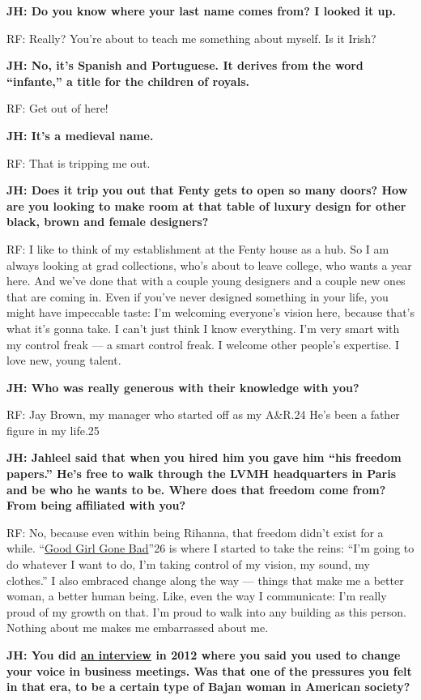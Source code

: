 \textbf{JH: Do you know where your last name comes from? I looked it
up.}

RF: Really? You're about to teach me something about myself. Is it
Irish?

\textbf{JH: No, it's Spanish and Portuguese. It derives from the word
``infante,'' a title for the children of royals.}

RF: Get out of here!

\textbf{JH: It's a medieval name.}

RF: That is tripping me out.

\textbf{JH: Does it trip you out that Fenty gets to open so many doors?
How are you looking to make room at that table of luxury design for
other black, brown and female designers?}

RF: I like to think of my establishment at the Fenty house as a hub. So
I am always looking at grad collections, who's about to leave college,
who wants a year here. And we've done that with a couple young designers
and a couple new ones that are coming in. Even if you've never designed
something in your life, you might have impeccable taste: I'm welcoming
everyone's vision here, because that's what it's gonna take. I can't
just think I know everything. I'm very smart with my control freak --- a
smart control freak. I welcome other people's expertise. I love new,
young talent.

\textbf{JH: Who was really generous with their knowledge with you?}

RF: Jay Brown, my manager who started off as my A\&R.24 He's been a
father figure in my life.25

\textbf{JH: Jahleel said that when you hired him you gave him ``his
freedom papers.'' He's free to walk through the LVMH headquarters in
Paris and be who he wants to be. Where does that freedom come from? From
being affiliated with you?}

RF: No, because even within being Rihanna, that freedom didn't exist for
a while.
``\href{https://open.spotify.com/album/4OXnPSBtZo8PBFiTOfuumP}{Good Girl
Gone Bad}''26 is where I started to take the reins: ``I'm going to do
whatever I want to do, I'm taking control of my vision, my sound, my
clothes.'' I also embraced change along the way --- things that make me
a better woman, a better human being. Like, even the way I communicate:
I'm really proud of my growth on that. I'm proud to walk into any
building as this person. Nothing about me makes me embarrassed about me.

\textbf{JH: You did
\href{https://www.youtube.com/watch?v=5dnrohN4P0A}{an interview} in 2012
where you said you used to change your voice in business meetings. Was
that one of the pressures you felt in that era, to be a certain type of
Bajan woman in American society?}

